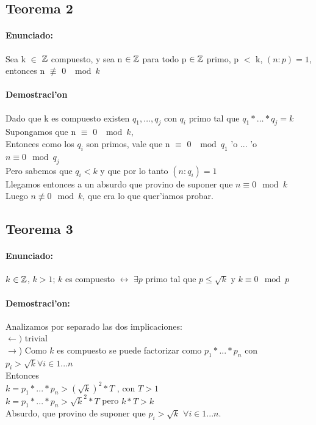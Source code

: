 \subsection{Teorema 2}
\paragraph{Enunciado:}
Sea k $\in$ ${\mathbb Z}$ compuesto, y sea n ${\in {\mathbb Z}}$ para todo p ${\in {\mathbb Z}}$ primo, p $<$ k, $(n:p) = 1$, entonces n $\not\equiv$ 0 $\mod{k}$
\paragraph{Demostraci'on}
Dado que k es compuesto existen $q_1,\ldots,q_j$ con $q_i$ primo tal que $q_1*\ldots*q_j = k$ \\
Supongamos que n $\equiv$ 0 $\mod{k}$,\\
Entonces como los $q_i$ son primos, vale que n $\equiv$ 0 $\mod{q_1}$ 'o ... 'o $n \equiv 0 \mod{q_j}$ \\
Pero sabemos que $q_i < k$ y que por lo tanto $(n:q_{i}) = 1$ \\
Llegamos entonces a un absurdo que provino de suponer que  $n \equiv 0 \mod{k}$ \\ 
Luego $n \not\equiv 0 \mod{k}$, que era lo que quer'iamos probar.

\subsection{Teorema 3}
\paragraph{Enunciado:}
$k$ ${\in {\mathbb Z}}$, $k>1$; $k$ es compuesto $\longleftrightarrow$ $\exists p$ primo tal que $p \leq \sqrt{k}$ y $k \equiv 0 \mod{p}$
\paragraph{Demostraci'on:}
Analizamos por separado las dos implicaciones: \\
$\leftarrow)$ trivial \\
$\rightarrow$) Como $k$ es compuesto se puede factorizar como $p_1*...*p_n$ con $p_i > \sqrt{k} \forall i \in {1...n}$\\
Entonces \\
$k = p_1*...*p_n > (\sqrt{k})^2*T$ , con $T>1$\\  
$k = p_1*...*p_n > \sqrt{k}^2*T$ pero $k*T > k$ \\
Absurdo, que provino de suponer que $p_i > \sqrt{k}$ $\forall i \in {1...n}$.\\

